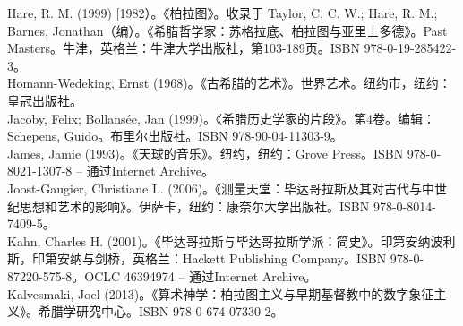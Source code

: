 Hare, R. M. (1999) [1982）。《柏拉图》。收录于 Taylor, C. C. W.; Hare, R. M.; Barnes, Jonathan（编）。《希腊哲学家：苏格拉底、柏拉图与亚里士多德》。Past Masters。牛津，英格兰：牛津大学出版社，第103-189页。ISBN 978-0-19-285422-3。\\  
Homann-Wedeking, Ernst (1968)。《古希腊的艺术》。世界艺术。纽约市，纽约：皇冠出版社。\\  
Jacoby, Felix; Bollansée, Jan (1999)。《希腊历史学家的片段》。第4卷。编辑：Schepens, Guido。布里尔出版社。ISBN 978-90-04-11303-9。\\  
James, Jamie (1993)。《天球的音乐》。纽约，纽约：Grove Press。ISBN 978-0-8021-1307-8 – 通过Internet Archive。\\  
Joost-Gaugier, Christiane L. (2006)。《测量天堂：毕达哥拉斯及其对古代与中世纪思想和艺术的影响》。伊萨卡，纽约：康奈尔大学出版社。ISBN 978-0-8014-7409-5。\\  
Kahn, Charles H. (2001)。《毕达哥拉斯与毕达哥拉斯学派：简史》。印第安纳波利斯，印第安纳与剑桥，英格兰：Hackett Publishing Company。ISBN 978-0-87220-575-8。OCLC 46394974 – 通过Internet Archive。\\  
Kalvesmaki, Joel (2013)。《算术神学：柏拉图主义与早期基督教中的数字象征主义》。希腊学研究中心。ISBN 978-0-674-07330-2。\\